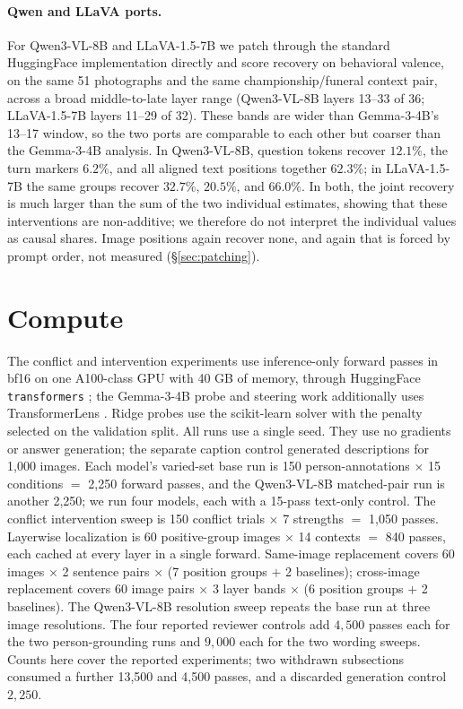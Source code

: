 \documentclass{article}
\newcommand{\todo}[1]{}
\newcommand{\todo}[1]{\textcolor{red}{[TODO: #1]}}
\newcommand{\gemma}{Gemma-3-4B}
\newcommand{\qwen}{Qwen3-VL-8B}
\newcommand{\llava}{LLaVA-1.5-7B}
\begin{document}
\paragraph{Qwen and LLaVA ports.}
For \qwen{} and \llava{} we patch through the standard HuggingFace implementation directly and score recovery on behavioral valence, on the same 51 photographs and the same championship/funeral context pair, across a broad middle-to-late layer range (\qwen{} layers 13--33 of 36; \llava{} layers 11--29 of 32). These bands are wider than \gemma{}'s 13--17 window, so the two ports are comparable to each other but coarser than the \gemma{} analysis. In \qwen{}, question tokens recover $12.1\%$, the turn markers $6.2\%$, and all aligned text positions together $62.3\%$; in \llava{} the same groups recover $32.7\%$, $20.5\%$, and $66.0\%$. In both, the joint recovery is much larger than the sum of the two individual estimates, showing that these interventions are non-additive; we therefore do not interpret the individual values as causal shares. Image positions again recover none, and again that is forced by prompt order, not measured (\S\ref{sec:patching}).

\section{Compute}
\label{app:compute}

The conflict and intervention experiments use inference-only forward passes in bf16 on one A100-class GPU with 40 GB of memory, through HuggingFace \texttt{transformers} \citep{wolf2020}; the \gemma{} probe and steering work additionally uses TransformerLens \citep{transformerlens}. Ridge probes use the scikit-learn solver with the penalty selected on the validation split. All runs use a single seed. They use no gradients or answer generation; the separate caption control generated descriptions for 1{,}000 images. Each model's varied-set base run is 150 person-annotations $\times$ 15 conditions $=$ 2{,}250 forward passes, and the \qwen{} matched-pair run is another 2{,}250; we run four models, each with a 15-pass text-only control. The conflict intervention sweep is 150 conflict trials $\times$ 7 strengths $=$ 1{,}050 passes. Layerwise localization is 60 positive-group images $\times$ 14 contexts $=$ 840 passes, each cached at every layer in a single forward. Same-image replacement covers 60 images $\times$ 2 sentence pairs $\times$ (7 position groups $+$ 2 baselines); cross-image replacement covers 60 image pairs $\times$ 3 layer bands $\times$ (6 position groups $+$ 2 baselines). The \qwen{} resolution sweep repeats the base run at three image resolutions. The four reported reviewer controls add $4{,}500$ passes each for the two person-grounding runs and $9{,}000$ each for the two wording sweeps. Counts here cover the reported experiments; two withdrawn subsections consumed a further 13{,}500 and 4{,}500 passes, and a discarded generation control $2{,}250$. \todo{Add wall-clock totals per run from the session logs for camera-ready; the full project including preliminary and failed runs used more compute than the reported experiments.}

\newpage

\end{document}
